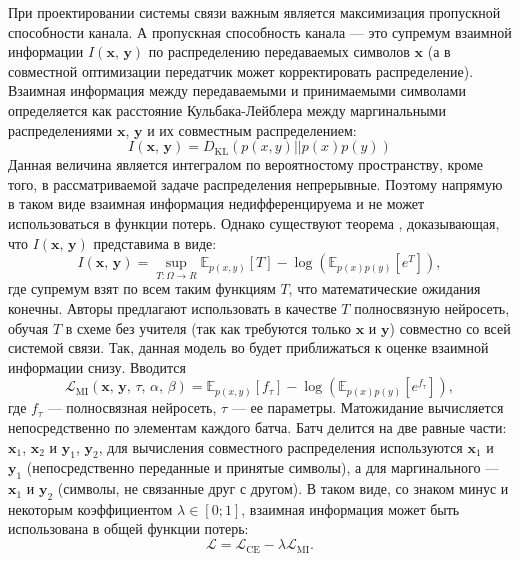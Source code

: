 \documentclass[a4paper,12pt]{article}
\begin{document}
	При проектировании системы связи важным является максимизация пропускной способности канала. А  пропускная способность канала --- это супремум взаимной информации $I(\mathbf{x},\,\mathbf{y})$ по распределению передаваемых символов $\mathbf{x}$ (а в совместной оптимизации передатчик может корректировать распределение). Взаимная информация между передаваемыми и принимаемыми символами определяется как расстояние Кульбака-Лейблера между маргинальными распределениями $\mathbf{x}$, $\mathbf{y}$ и их совместным распределением:
	 \begin{equation}
	 	I(\mathbf{x},\,\mathbf{y}) = D_\text{KL}(p({x}, {y})||p({x}) p({y}))
	 \end{equation}
	 Данная величина является интегралом по вероятностому пространству, кроме того, в рассматриваемой задаче распределения непрерывные. Поэтому напрямую в таком виде взаимная информация недифференцируема и не может использоваться в функции потерь. Однако существуют теорема \cite{belghazi2018mine}, доказывающая, что $I(\mathbf{x},\,\mathbf{y})$ представима в виде:
	 \begin{equation} 
	 	I(\mathbf{x},\,\mathbf{y}) = 
	 	\underset{T: \Omega \rightarrow R}{\sup}\mathbb{E}_{p(x,y)}[T] -
	 	\log(\mathbb{E}_{p(x)p(y)}[e^T]),
	 \end{equation}
	где супремум взят по всем таким функциям $T$, что математические ожидания конечны. Авторы предлагают использовать в качестве $T$ полносвязную нейросеть, обучая $T$ в схеме без учителя (так как требуются только $\mathbf{x}$ и $\mathbf{y}$) совместно со всей системой связи. Так, данная модель во будет приближаться к оценке взаимной информации снизу. Вводится 
	\begin{equation}
		\mathcal{L}_\text{MI}(\mathbf{x},\,\mathbf{y},\,\tau,\,\alpha,\,\beta) = \mathbb{E}_{p(x,y)}[f_\tau] -
		\log(\mathbb{E}_{p(x)p(y)}[e^{f_\tau}]),
	\end{equation}
	где $f_\tau$ --- полносвязная нейросеть, $\tau$ --- ее параметры. Матожидание вычисляется непосредственно по элементам каждого батча. Батч делится на две равные части: $\mathbf{x}_1$, $\mathbf{x}_2$ и  $\mathbf{y}_1$, $\mathbf{y}_2$, для вычисления совместного распределения используются $\mathbf{x}_1$ и $\mathbf{y}_1$ (непосредственно переданные и принятые символы), а для маргинального --- $\mathbf{x}_1$ и $\mathbf{y}_2$ (символы, не связанные друг с другом). В таком виде, со знаком минус и некоторым коэффициентом $\lambda\in[0;1]$, взаимная информация может быть использована в общей функции потерь:
	\begin{equation}
		\mathcal{L} = \mathcal{L}_\text{CE} - \lambda \mathcal{L}_\text{MI}.
	\end{equation}
\end{document}
